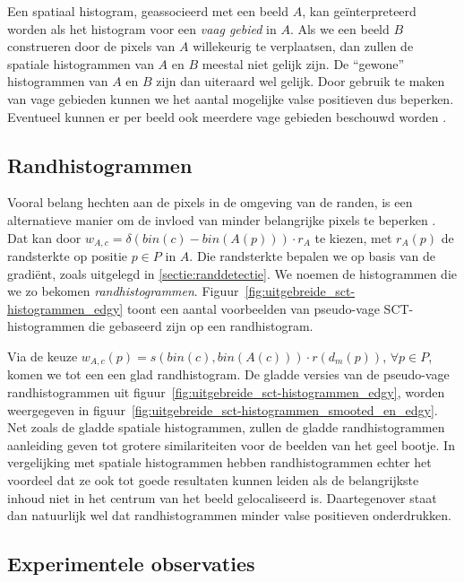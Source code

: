 Een spatiaal histogram, geassocieerd met een beeld $A$, kan ge\"interpreteerd worden als het 
histogram voor een \emph{vaag gebied} in $A$. Als we een beeld $B$ construeren door de pixels
van $A$ willekeurig te verplaatsen, dan zullen de spatiale histogrammen van $A$ en $B$
meestal niet gelijk zijn. De ``gewone'' histogrammen van $A$ en $B$ zijn dan uiteraard wel gelijk. 
Door gebruik te maken van vage gebieden kunnen we het aantal mogelijke
valse positieven dus beperken. Eventueel kunnen er per beeld ook meerdere vage gebieden beschouwd
worden \cite{stricker:fuzzy_regions_for_image_indexing}.
 
\subsection{Randhistogrammen} 
 
Vooral belang hechten aan de pixels in de omgeving van de randen, is een alternatieve
manier om de invloed van minder belangrijke pixels te beperken 
\cite{vertan:upgrading_color_distribution_for_ir}. Dat kan door 
$w_{A,c}=\delta(bin(c)-bin(A(p))) \cdot r_{A}$ te kiezen, met $r_{A}(p)$ de randsterkte op positie $p \in P$ in $A$.
Die randsterkte bepalen we op basis van de gradi\"ent, zoals uitgelegd in \ref{sectie:randdetectie}.  
We noemen de histogrammen die we zo bekomen \emph{randhistogrammen}. 
Figuur~\ref{fig:uitgebreide_sct-histogrammen_edgy} toont een aantal voorbeelden van
pseudo-vage SCT-histogrammen die gebaseerd zijn op een randhistogram.

Via de keuze $w_{A,c}(p)=s(bin(c),bin(A(c))) \cdot r(d_m(p))$, $\forall p \in P$, komen
we tot een een glad randhistogram. De gladde versies van de pseudo-vage
randhistogrammen uit figuur~\ref{fig:uitgebreide_sct-histogrammen_edgy}, worden
weergegeven in figuur~\ref{fig:uitgebreide_sct-histogrammen_smooted_en_edgy}. 
Net zoals de gladde spatiale histogrammen, zullen de
gladde randhistogrammen aanleiding geven tot grotere similariteiten
voor de beelden van het geel bootje.
In vergelijking met spatiale histogrammen hebben randhistogrammen echter het
voordeel dat ze ook tot goede resultaten kunnen leiden als de belangrijkste inhoud niet
in het centrum van het beeld gelocaliseerd is. Daartegenover staat dan natuurlijk wel
dat randhistogrammen minder valse positieven onderdrukken.

\subsection{Experimentele observaties}